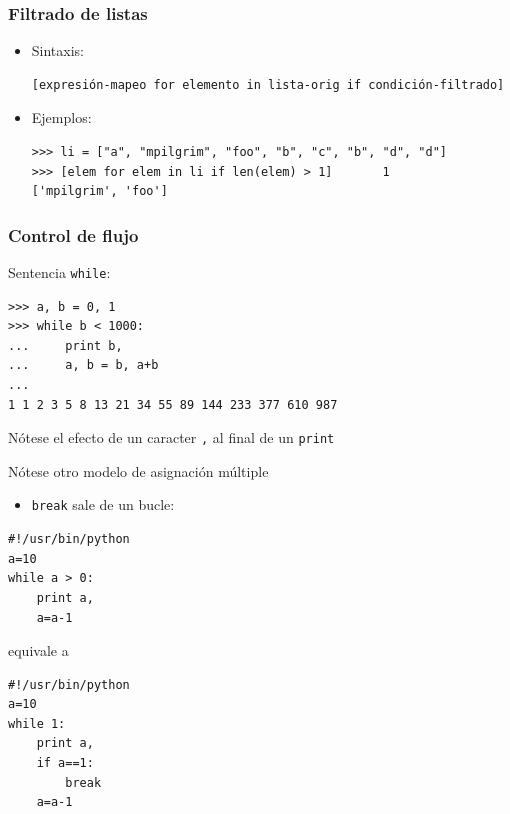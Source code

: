 \documentclass{beamer}
\begin{document}
\begin{frame}[fragile]
\frametitle{Filtrado de listas}
\begin{itemize}
\item Sintaxis:
\begin{footnotesize}
\begin{verbatim}
[expresión-mapeo for elemento in lista-orig if condición-filtrado]
\end{verbatim}
\end{footnotesize}
\item Ejemplos:
\begin{footnotesize}
\begin{verbatim}
>>> li = ["a", "mpilgrim", "foo", "b", "c", "b", "d", "d"]
>>> [elem for elem in li if len(elem) > 1]       1
['mpilgrim', 'foo']
\end{verbatim}
\end{footnotesize}

\end{itemize}
 
\end{frame}








\begin{frame}[fragile]
 
\frametitle{Control de flujo}
Sentencia \verb|while|:
\begin{footnotesize}
\begin{verbatim}
>>> a, b = 0, 1
>>> while b < 1000:
...     print b,
...     a, b = b, a+b
... 
1 1 2 3 5 8 13 21 34 55 89 144 233 377 610 987
\end{verbatim}
\end{footnotesize}
Nótese el efecto de un caracter \verb|,| al final de un \verb|print|

Nótese otro modelo de asignación múltiple 

\end{frame}


\begin{frame}[fragile]

\begin{itemize}
  
\item 
\verb|break| sale de un bucle:
\end{itemize}

\begin{footnotesize}
\begin{verbatim}
#!/usr/bin/python
a=10
while a > 0:
    print a,
    a=a-1

\end{verbatim}
\end{footnotesize}

equivale a 

\begin{footnotesize}
\begin{verbatim}
#!/usr/bin/python
a=10
while 1:
    print a,
    if a==1:
        break
    a=a-1
\end{verbatim}
\end{footnotesize}
\end{frame}
\end{document}
